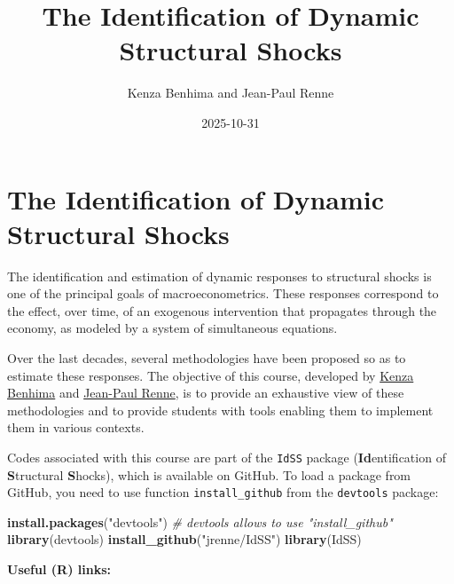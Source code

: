 \documentclass[
  12pt,
]{book}
\title{The Identification of Dynamic Structural Shocks}
\author{Kenza Benhima and Jean-Paul Renne}
\date{2025-10-31}
\newenvironment{Shaded}{\begin{snugshade}}{\end{snugshade}}
\newcommand{\CommentTok}[1]{\textcolor[rgb]{0.56,0.35,0.01}{\textit{#1}}}
\newcommand{\FunctionTok}[1]{\textcolor[rgb]{0.13,0.29,0.53}{\textbf{#1}}}
\newcommand{\NormalTok}[1]{#1}
\newcommand{\StringTok}[1]{\textcolor[rgb]{0.31,0.60,0.02}{#1}}
\theoremstyle{definition}
\theoremstyle{definition}
\theoremstyle{definition}
\theoremstyle{definition}
\theoremstyle{remark}
\begin{document}
\maketitle

{
\setcounter{tocdepth}{1}
\tableofcontents
}
\newcommand{\bv}[1]{\mathbf{#1}}

\chapter*{The Identification of Dynamic Structural Shocks}\label{intro}

The identification and estimation of dynamic responses to structural shocks is one of the principal goals of macroeconometrics. These responses correspond to the effect, over time, of an exogenous intervention that propagates through the economy, as modeled by a system of simultaneous equations.

Over the last decades, several methodologies have been proposed so as to estimate these responses. The objective of this course, developed by \href{https://sites.google.com/site/benhimakenza/}{Kenza Benhima} and \href{https://www.jprenne.com}{Jean-Paul Renne}, is to provide an exhaustive view of these methodologies and to provide students with tools enabling them to implement them in various contexts.

Codes associated with this course are part of the \texttt{IdSS} package (\textbf{Id}entification of \textbf{S}tructural \textbf{S}hocks), which is available on GitHub. To load a package from GitHub, you need to use function \texttt{install\_github} from the \texttt{devtools} package:

\begin{Shaded}
\begin{Highlighting}[]
\FunctionTok{install.packages}\NormalTok{(}\StringTok{"devtools"}\NormalTok{) }\CommentTok{\# devtools allows to use "install\_github"}
\FunctionTok{library}\NormalTok{(devtools)}
\FunctionTok{install\_github}\NormalTok{(}\StringTok{"jrenne/IdSS"}\NormalTok{)}
\FunctionTok{library}\NormalTok{(IdSS)}
\end{Highlighting}
\end{Shaded}

\textbf{Useful (R) links:}
\end{document}
